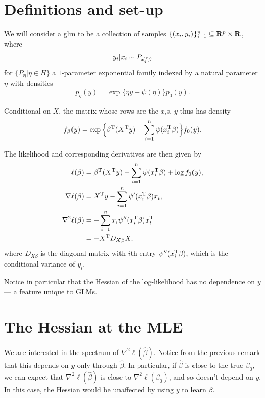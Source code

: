 \documentclass{hw-scrartcl}
\begin{document}
\maketitle
\section{Definitions and set-up}
We will consider a glm to be a collection of samples \(\{(x_i, y_i)\}_{i=1}^n \subseteq \mathbf{R}^p \times \mathbf{R}\), where
\[
  y_i|x_i
  \sim P_{x_i ^{\mathrm{T}} \beta}
\]
for \(\{P_\eta | \eta \in H\}\) a \(1\)-parameter exponential family indexed by a natural parameter \(\eta\) with densities
\[
  p_\eta(y)
  = \exp\{\eta y - \psi(\eta)\} p_0(y).
\]

Conditional on \(X\), the matrix whose rows are the \(x_i\)s, \(y\) thus has density
\[
  f_\beta(y)
  = \exp\Big\{\beta^{\mathrm{T}} (X^{\mathrm{T}} y) - \sum_{i=1}^n \psi(x_i^{\mathrm{T}} \beta)\Big\} f_0(y).
\]

The likelihood and corresponding derivatives are then given by
\begin{align*}
  \ell(\beta)
  &= \beta^{\mathrm{T}} (X^{\mathrm{T}} y) - \sum_{i=1}^n \psi(x_i^{\mathrm{T}} \beta) + \log f_0(y), \\
  \nabla \ell(\beta)
  &= X^{\mathrm{T}} y - \sum_{i=1}^n \psi'(x_i^{\mathrm{T}} \beta) x_i, \\
  \nabla^2 \ell(\beta)
  &= -\sum_{i=1}^n x_i \psi''(x_i^{\mathrm{T}} \beta) x_t ^{\mathrm{T}} \\
  &= -X^{\mathrm{T}} D_{X\beta} X,
\end{align*}
where \(D_{X\beta}\) is the diagonal matrix with \(i\)th entry \(\psi''(x_i^{\mathrm{T}} \beta)\), which is the conditional variance of \(y_i\).

Notice in particular that the Hessian of the log-likelihood has no dependence on \(y\) --- a feature unique to GLMs.

\section{The Hessian at the MLE}
We are interested in the spectrum of \(\nabla^2 \ell(\hat{\beta})\). Notice from the previous remark that this depends on \(y\) only through \(\hat{\beta}\). In particular, if \(\hat{\beta}\) is close to the true \(\beta_0\), we can expect that \(\nabla^2 \ell(\hat{\beta})\) is close to \(\nabla^2 \ell(\beta_0)\), and so doesn't depend on \(y\). In this case, the Hessian would be unaffected by using \(y\) to learn \(\beta\).
\end{document}
